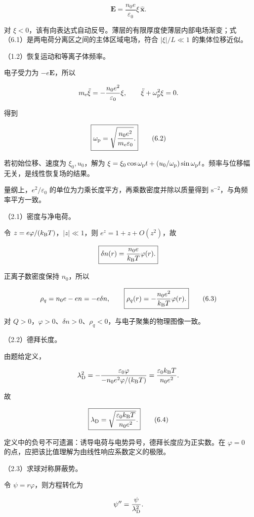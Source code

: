 \documentclass[12pt,a4paper,fontset=fandol]{ctexart}
\begin{document}
\[
\boxed{\boldsymbol E=\frac{n_0e}{\varepsilon_0}\xi\,\hat{\boldsymbol x}.}
\tag{6.1}
\]

对
\(\xi<0\)，该有向表达式自动反号。薄层的有限厚度使薄层内部电场渐变；式（6.1）是两电荷分离区之间的主体区域电场，符合
\(|\xi|/L\ll1\) 的集体位移近似。

（1.2）恢复运动和等离子体频率。

电子受力为 \(-e\boldsymbol E\)，所以

\[
m_{\rm e}\ddot\xi=-\frac{n_0e^2}{\varepsilon_0}\xi,
\qquad
\ddot\xi+\omega_{\rm p}^2\xi=0.
\]

得到

\[
\boxed{\omega_{\rm p}=\sqrt{\frac{n_0e^2}{m_{\rm e}\varepsilon_0}}.}
\tag{6.2}
\]

若初始位移、速度为 \(\xi_0,u_0\)，解为
\(\xi=\xi_0\cos\omega_{\rm p}t+(u_0/\omega_{\rm p})\sin\omega_{\rm p}t\)。频率与位移幅无关，是线性恢复场的结果。

量纲上，\(e^2/\varepsilon_0\)
的单位为力乘长度平方，再乘数密度并除以质量得到
\(\mathrm{s^{-2}}\)，与角频率平方一致。

（2.1）密度与净电荷。

令 \(z=e\varphi/(k_{\rm B}T)\)，\(|z|\ll1\)，则 \(e^z=1+z+O(z^2)\)，故

\[
\boxed{\delta n(r)=\frac{n_0e}{k_{\rm B}T}\varphi(r).}
\]

正离子数密度保持 \(n_0\)，所以

\[
\rho_q=n_0e-en=-e\delta n,
\qquad
\boxed{\rho_q(r)=-\frac{n_0e^2}{k_{\rm B}T}\varphi(r).}
\tag{6.3}
\]

对
\(Q>0\)，\(\varphi>0\)、\(\delta n>0\)、\(\rho_q<0\)，与电子聚集的物理图像一致。

（2.2）德拜长度。

由题给定义，

\[
\lambda_{\rm D}^2=-\frac{\varepsilon_0\varphi}
{-n_0e^2\varphi/(k_{\rm B}T)}
=\frac{\varepsilon_0k_{\rm B}T}{n_0e^2}.
\]

故

\[
\boxed{\lambda_{\rm D}=\sqrt{\frac{\varepsilon_0k_{\rm B}T}{n_0e^2}}.}
\tag{6.4}
\]

定义中的负号不可遗漏：诱导电荷与电势异号，德拜长度应为正实数。在
\(\varphi=0\) 的点，应把该比值理解为由线性响应系数定义的极限。

（2.3）求球对称屏蔽势。

令 \(\psi=r\varphi\)，则方程转化为

\[
\psi''=\frac{\psi}{\lambda_{\rm D}^2}.
\]
\end{document}
